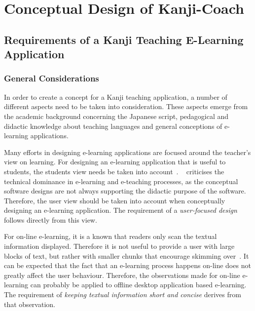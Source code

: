 
\chapter{Conceptual Design of Kanji-Coach}
\label{chap:conceptualdesignofKanjicoach}

\section{Requirements of a Kanji Teaching E-Learning Application}
\label{sec:concept:requirements}

\subsection{General Considerations}
\label{sec:concept:generalconsiderations}

In order to create a concept for a Kanji teaching application,
a number of different aspects need to be taken into consideration.
These aspects emerge from the academic background concerning the Japanese script,
pedagogical and didactic knowledge about teaching languages and general
conceptions of e-learning applications.

Many efforts in designing e-learning applications are focused around the
teacher's view on learning. For designing an e-learning application that
is useful to students, the students view needs be taken into 
account~. 
~\citeyear{Ivashin2009} criticises the technical 
dominance in e-learning and e-teaching processes, as the conceptual software
designs are not always supporting the didactic purpose of the software.
Therefore, the user view should be taken into account when conceptually designing
an e-learning application.
The requirement of a \emph{user-focused design} follows directly from this view.

For on-line e-learning, it is a known that readers only scan the textual 
information displayed. Therefore it is not useful to provide a user with 
large blocks of text, but rather with smaller chunks that encourage 
skimming over~. It can be expected that the fact
that an e-learning process happens on-line does not greatly affect the user 
behaviour. Therefore, the observations made for on-line e-learning can
probably be applied to offline desktop application based e-learning.
The requirement of \emph{keeping textual information short and concise} derives
from that observation.

